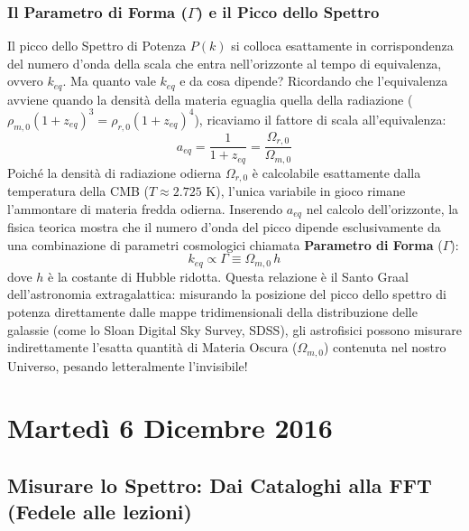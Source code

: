 \documentclass[11pt,a4paper]{report}
\begin{document}
\subsection{Il Parametro di Forma ($\Gamma$) e il Picco dello Spettro}
Il picco dello Spettro di Potenza $P(k)$ si colloca esattamente in corrispondenza del numero d'onda della scala che entra nell'orizzonte al tempo di equivalenza, ovvero $k_{eq}$. Ma quanto vale $k_{eq}$ e da cosa dipende?
Ricordando che l'equivalenza avviene quando la densità della materia eguaglia quella della radiazione ($\rho_{m,0} (1+z_{eq})^3 = \rho_{r,0} (1+z_{eq})^4$), ricaviamo il fattore di scala all'equivalenza:
\begin{equation}
a_{eq} = \frac{1}{1+z_{eq}} = \frac{\Omega_{r,0}}{\Omega_{m,0}}
\end{equation}
Poiché la densità di radiazione odierna $\Omega_{r,0}$ è calcolabile esattamente dalla temperatura della CMB ($T \approx 2.725$ K), l'unica variabile in gioco rimane l'ammontare di materia fredda odierna. Inserendo $a_{eq}$ nel calcolo dell'orizzonte, la fisica teorica mostra che il numero d'onda del picco dipende esclusivamente da una combinazione di parametri cosmologici chiamata \textbf{Parametro di Forma} ($\Gamma$):
\begin{equation}
k_{eq} \propto \Gamma \equiv \Omega_{m,0} \, h
\end{equation}
dove $h$ è la costante di Hubble ridotta. 
Questa relazione è il Santo Graal dell'astronomia extragalattica: misurando la posizione del picco dello spettro di potenza direttamente dalle mappe tridimensionali della distribuzione delle galassie (come lo Sloan Digital Sky Survey, SDSS), gli astrofisici possono misurare indirettamente l'esatta quantità di Materia Oscura ($\Omega_{m,0}$) contenuta nel nostro Universo, pesando letteralmente l'invisibile!

\chapter{Martedì 6 Dicembre 2016}

\section{Misurare lo Spettro: Dai Cataloghi alla FFT (Fedele alle lezioni)}
\end{document}
